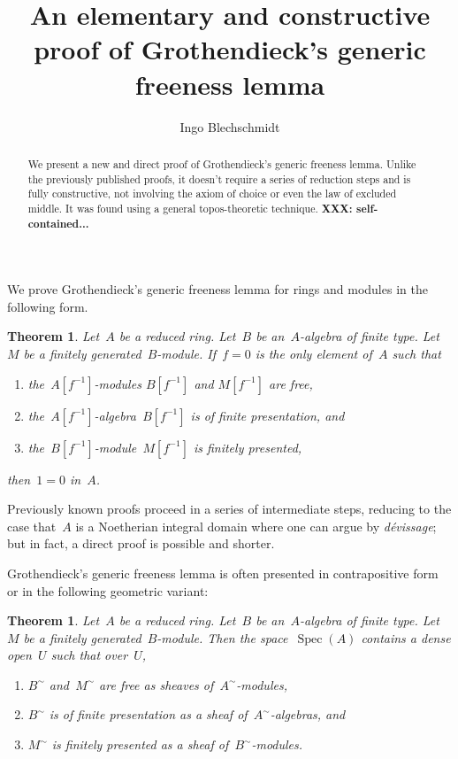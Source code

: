 \documentclass{amsart}
\title{An elementary and constructive proof of Grothendieck's generic freeness
lemma}
\author{Ingo Blechschmidt}
\theoremstyle{definition}
\theoremstyle{plain}
\newtheorem{thm}[defn]{Theorem}
\theoremstyle{remark}
\newcommand{\XXX}[1]{\textbf{XXX: #1}}
\DeclareMathOperator{\Spec}{Spec}
\begin{document}
\begin{abstract}
  We present a new and direct proof of Grothendieck's generic freeness
  lemma. Unlike the previously published proofs, it doesn't require a series of
  reduction steps and is fully constructive, not involving the axiom of choice
  or even the law of excluded middle. It was found using a general
  topos-theoretic technique. \XXX{self-contained...}
\end{abstract}

\maketitle

We prove Grothendieck's generic freeness lemma for rings and modules in the
following form.

\begin{thm}\label{thm:algebraic}Let~$A$ be a reduced ring. Let~$B$ be
an~$A$-algebra of finite type. Let~$M$ be a finitely generated~$B$-module.
If~$f = 0$ is the only element of~$A$ such that
\begin{enumerate}
\item the~$A[f^{-1}]$-modules $B[f^{-1}]$ and $M[f^{-1}]$ are free,
\item the~$A[f^{-1}]$-algebra~$B[f^{-1}]$ is of finite presentation, and
\item the~$B[f^{-1}]$-module~$M[f^{-1}]$ is finitely presented,
\end{enumerate}
then~$1 = 0$ in~$A$.
\end{thm}

Previously known proofs proceed in a series of intermediate steps, reducing
to the case that~$A$ is a Noetherian integral domain where one can argue by
\emph{dévissage}; but in fact, a direct proof is possible and shorter.

Grothendieck's generic freeness lemma is often presented in contrapositive form
or in the following geometric variant:

\begin{thm}\label{thm:geometric}Let~$A$ be a reduced ring. Let~$B$ be
an~$A$-algebra of finite type. Let~$M$ be a finitely generated~$B$-module. Then
the space~$\Spec(A)$ contains a dense open~$U$ such that over~$U$,
\begin{enumerate}
\item[(a)] $B^\sim$ and~$M^\sim$ are free as sheaves of~$A^\sim$-modules,
\item[(b)] $B^\sim$ is of finite presentation as a sheaf of~$A^\sim$-algebras, and
\item[(c)] $M^\sim$ is finitely presented as a sheaf of~$B^\sim$-modules.
\end{enumerate}
\end{thm}
\end{document}
